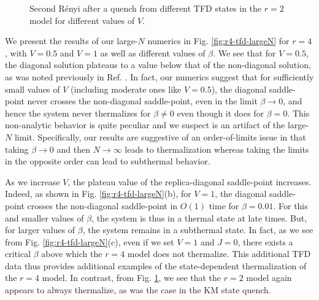 \documentclass[reprint, floatfix,eqsecnum,superscriptaddress,preprint,nofootinbib,onecolumn,amsmath,amssymb,aps,prb]{revtex4-2}
\begin{document}
\begin{figure}%
  \caption{ Second R\'enyi after a quench from different TFD states in the $r=2$ model for different values of $V$. %
  }
  \label{fig:r2-tfd-largeN}
\end{figure}

We present the results of our large-$N$ numerics in Fig. \ref{fig:r4-tfd-largeN} for $r=4$, with $V=0.5$ and $V=1$ as well as different values of $\beta$. 
We see that for $V=0.5$, the diagonal solution plateaus to a value below that of the non-diagonal solution, as was noted previously in Ref. \cite{Penington2019}. In fact, our numerics suggest that for sufficiently small values of $V$ (including moderate ones like $V=0.5$), the diagonal saddle-point never crosses the non-diagonal saddle-point, even in the limit $\beta \to 0$, 
and hence the system never thermalizes for $\beta \neq 0$ even though it does for $\beta = 0$.
This non-analytic behavior is quite peculiar and we suspect is an artifact of the large-$N$ limit. Specifically, our results are suggestive of an order-of-limits issue in that taking $\beta \to 0$ and then $N \to \infty$ leads to thermalization whereas taking the limits in the opposite order can lead to subthermal behavior.


As we increase $V$, the plateau value of the replica-diagonal saddle-point increases. 
Indeed, as shown in Fig. \ref{fig:r4-tfd-largeN}(b), for $V=1$, the diagonal saddle-point crosses the non-diagonal saddle-point in $O(1)$ time for $\beta = 0.01$. For this and smaller values of $\beta$, the system is thus in a thermal state at late times. 
But, for larger values of $\beta$, the system remains in a subthermal state. 
In fact, as we see from Fig. \ref{fig:r4-tfd-largeN}(c), even if we set $V=1$ and $J=0$, there exists a critical $\beta$ above which the $r=4$ model does not thermalize. This additional TFD data thus provides additional examples of the state-dependent thermalization of the $r=4$ model. In contrast, from Fig. \ref{fig:r2-tfd-largeN}, we see that the $r=2$ model again appears to always thermalize, as was the case in the KM state quench.
\end{document}

